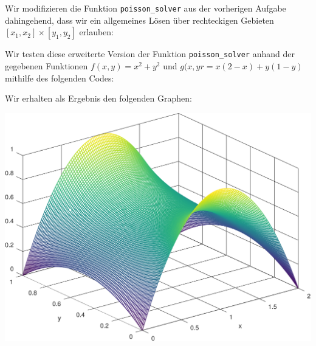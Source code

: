 \section{}

Wir modifizieren die Funktion \texttt{poisson\_solver} aus der vorherigen Aufgabe dahingehend, dass wir ein allgemeines Lösen über rechteckigen Gebieten $[x_1, x_2] \times [y_1, y_2]$ erlauben:



Wir testen diese erweiterte Version der Funktion \texttt{poisson\_solver} anhand der gegebenen Funktionen $f(x,y) = x^2 + y^2$ und $g(x,yr = x(2-x) + y(1-y)$ mithilfe des folgenden Codes:



Wir erhalten als Ergebnis den folgenden Graphen:

\begin{center}
  \includegraphics[width = \textwidth]{chapter_08/exercise_08_43_figure.pdf}
\end{center}


